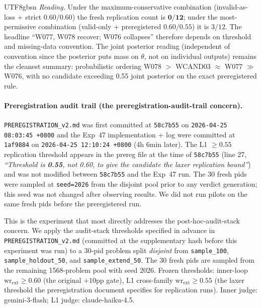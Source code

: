 \documentclass{article}
\begin{document}
\begin{CJK*}{UTF8}{gbsn}
\noindent\emph{Reading.} Under the maximum-conservative
combination (invalid-as-loss + strict \(0.60/0.60\)) the fresh
replication count is \(\mathbf{0/12}\); under the most-permissive
combination (valid-only + preregistered \(0.60/0.55\)) it is
\(3/12\). The headline ``W077, W078 recover; W076 collapses''
therefore depends on threshold and missing-data convention. The
joint posterior reading (independent of convention since the
posterior puts mass on \(\theta\), not on individual outputs)
remains the cleanest summary: probabilistic ordering W078 \(>\)
WCAND03 \(\approx\) W077 \(\gg\) W076, with no candidate
exceeding 0.55 joint posterior on the exact preregistered rule.

\paragraph{Preregistration audit trail (the preregistration-audit-trail concern).}
\texttt{PREREGISTRATION\_v2.md} was first committed at
\texttt{58c7b55} on \texttt{2026-04-25 08:03:45 +0800} and the
Exp~47 implementation + log were committed at \texttt{1af9884} on
\texttt{2026-04-25 12:10:24 +0800} (4h 6min later). The L1
\(\geq 0.55\) replication threshold appears in the prereg file at
the time of \texttt{58c7b55} (line 27, \emph{``Threshold is
\textbf{0.55}, not 0.60, to give the candidate the laxer
replication bound''}) and was not modified between
\texttt{58c7b55} and the Exp~47 run. The 30 fresh pids were
sampled at \texttt{seed=2026} from the disjoint pool prior to any
verdict generation; this seed was not changed after observing
results. We did not run pilots on the same fresh pids before the
preregistered run.

This is the experiment that most directly addresses the
post-hoc-audit-stack concern. We apply the audit-stack thresholds
specified in advance in
\texttt{PREREGISTRATION\_v2.md} (committed at the supplementary
hash before this experiment was run) to a 30-pid problem split
\emph{disjoint} from
\texttt{sample\_100}, \texttt{sample\_holdout\_50}, and
\texttt{sample\_extend\_50}. The 30 fresh pids are sampled from the
remaining 1568-problem pool with seed \(2026\). Frozen thresholds:
inner-loop \(\mathrm{wr}_{\mathrm{ext}} \geq 0.60\) (the
original \(+10\)pp gate), L1 cross-family \(\mathrm{wr}_{\mathrm{ext}}
\geq 0.55\) (the laxer threshold the preregistration document
specifies for replication runs). Inner judge: gemini-3-flash; L1
judge: claude-haiku-4.5.


\end{CJK*}
\end{document}
